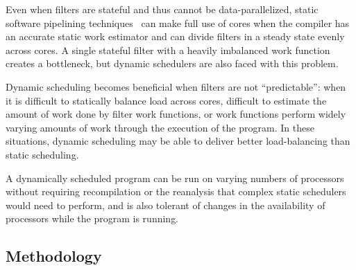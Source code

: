 Even when filters are stateful and thus cannot be data-parallelized,
static software pipelining techniques~\cite{asplos06} can make full
use of cores when the compiler has an accurate static work estimator
and can divide filters in a steady state evenly across
cores. A single stateful filter with a heavily imbalanced work
function creates a bottleneck, but dynamic schedulers are also faced
with this problem. 

Dynamic scheduling becomes beneficial when filters are not
``predictable'': when it is difficult to statically balance load
across cores, difficult to estimate the amount of work done by filter
work functions, or work functions perform widely varying amounts of
work through the execution of the program. In these situations,
dynamic scheduling may be able to deliver better load-balancing than
static scheduling.

A dynamically scheduled program can be run on varying numbers of
processors without requiring recompilation or the reanalysis that
complex static schedulers would need to perform, and is also tolerant
of changes in the availability of processors while the program is
running. 



\subsection{Methodology}

